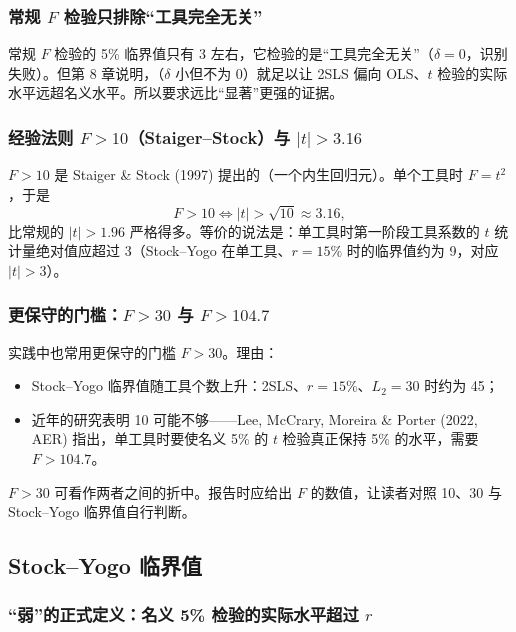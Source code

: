 \subsubsection{常规 \texorpdfstring{$F$}{F} 检验只排除“工具完全无关”}

常规 $F$ 检验的 5\% 临界值只有 3 左右，它检验的是“工具完全无关”（$\delta=0$，识别失败）。但第 8 章说明，（$\delta$ 小但不为 0）就足以让 2SLS 偏向 OLS、$t$ 检验的实际水平远超名义水平。所以要求远比“显著”更强的证据。

\subsubsection{经验法则 \texorpdfstring{$F>10$}{F>10}（Staiger--Stock）与 \texorpdfstring{$|t|>3.16$}{|t|>3.16}}

$F>10$ 是 Staiger \& Stock (1997) 提出的（一个内生回归元）。单个工具时 $F=t^2$，于是
\[
F>10\iff |t|>\sqrt{10}\approx3.16 ,
\]
比常规的 $|t|>1.96$ 严格得多。等价的说法是：单工具时第一阶段工具系数的 $t$ 统计量绝对值应超过 3（Stock--Yogo 在单工具、$r=15\%$ 时的临界值约为 9，对应 $|t|>3$）。

\subsubsection{更保守的门槛：\texorpdfstring{$F>30$}{F>30} 与 \texorpdfstring{$F>104.7$}{F>104.7}}

实践中也常用更保守的门槛 $F>30$。理由：
\begin{itemize}
  \item Stock--Yogo 临界值随工具个数上升：2SLS、$r=15\%$、$L_2=30$ 时约为 45；
  \item 近年的研究表明 10 可能不够——Lee, McCrary, Moreira \& Porter (2022, AER) 指出，单工具时要使名义 5\% 的 $t$ 检验真正保持 5\% 的水平，需要 $F>104.7$。
\end{itemize}
$F>30$ 可看作两者之间的折中。报告时应给出 $F$ 的数值，让读者对照 10、30 与 Stock--Yogo 临界值自行判断。

\subsection{Stock--Yogo 临界值}

\subsubsection{“弱”的正式定义：名义 5\% 检验的实际水平超过 \texorpdfstring{$r$}{r}}

